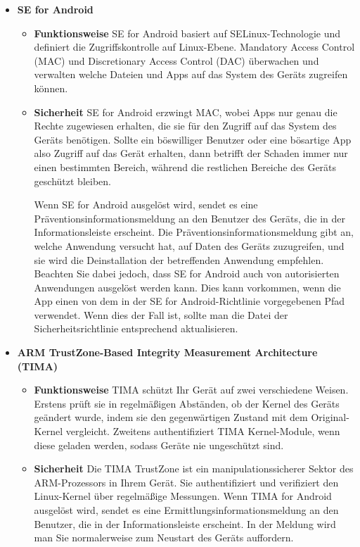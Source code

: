 \begin{itemize}
	\item \textbf{SE for Android}
	\begin{itemize}
		\item \textbf{Funktionsweise} \newline SE for Android basiert auf SELinux-Technologie und definiert die Zugriffskontrolle auf Linux-Ebene. Mandatory Access Control (MAC) und Discretionary Access Control (DAC) überwachen und verwalten welche Dateien und Apps auf das System des Geräts zugreifen können.
		\item \textbf{Sicherheit} \newline SE for Android erzwingt MAC, wobei Apps nur genau die Rechte zugewiesen erhalten, die sie für den Zugriff auf das System des Geräts benötigen. Sollte ein böswilliger Benutzer oder eine bösartige App also Zugriff auf das Gerät erhalten, dann betrifft der Schaden immer nur einen bestimmten Bereich, während die restlichen Bereiche des Geräts geschützt bleiben. \par Wenn SE for Android ausgelöst wird, sendet es eine Präventionsinformationsmeldung an den Benutzer des Geräts, die in der Informationsleiste erscheint. Die Präventionsinformationsmeldung gibt an, welche Anwendung versucht hat, auf Daten des Geräts zuzugreifen, und sie wird die Deinstallation der betreffenden Anwendung empfehlen. Beachten Sie dabei jedoch, dass SE for Android auch von autorisierten Anwendungen ausgelöst werden kann. Dies kann vorkommen, wenn die App einen von dem in der SE for Android-Richtlinie vorgegebenen Pfad verwendet. Wenn dies der Fall ist, sollte man die Datei der Sicherheitsrichtlinie entsprechend aktualisieren.
	\end{itemize}
	\item \textbf{ARM TrustZone-Based Integrity Measurement Architecture (TIMA)}
	\begin{itemize}
		\item \textbf{Funktionsweise} \newline TIMA schützt Ihr Gerät auf zwei verschiedene Weisen. Erstens prüft sie in regelmäßigen Abständen, ob der Kernel des Geräts geändert wurde, indem sie den gegenwärtigen Zustand mit dem Original-Kernel vergleicht. Zweitens authentifiziert TIMA Kernel-Module, wenn diese geladen werden, sodass Geräte nie ungeschützt sind.
		\item \textbf{Sicherheit} \newline Die TIMA TrustZone ist ein manipulationssicherer Sektor des ARM-Prozessors in Ihrem Gerät. Sie authentifiziert und verifiziert den Linux-Kernel über regelmäßige Messungen. Wenn TIMA for Android ausgelöst wird, sendet es eine Ermittlungsinformationsmeldung an den Benutzer, die in der Informationsleiste erscheint. In der Meldung wird man Sie normalerweise zum Neustart des Geräts auffordern.

\end{itemize}
\end{itemize}
